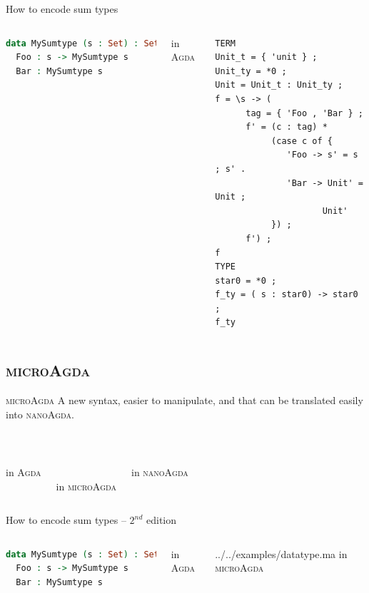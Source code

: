 \documentclass[xcolor=svgnames,11pt]{beamer}
\newcommand{\agda}{\textsc{Agda}\xspace}
\newcommand{\ma}{\textsc{microAgda}\xspace}
\newcommand{\na}{\textsc{nanoAgda}\xspace}
\begin{document}
\begin{frame}[fragile]{How to encode sum types}
\begin{columns}
\begin{lstlisting}[language=Agda]
data MySumtype (s : Set) : Set where
  Foo : s -> MySumtype s
  Bar : MySumtype s
\end{lstlisting}
\centering in \agda
{}\pause
\begin{lstlisting}[basicstyle=\scriptsize\ttfamily,language=nanoAgda]
TERM
Unit_t = { 'unit } ;
Unit_ty = *0 ;
Unit = Unit_t : Unit_ty ;
f = \s -> (
      tag = { 'Foo , 'Bar } ;
      f' = (c : tag) *
           (case c of {
              'Foo -> s' = s ; s' .
              'Bar -> Unit' = Unit ;
                     Unit'
           }) ;
      f') ;
f
TYPE
star0 = *0 ;
f_ty = ( s : star0) -> star0 ;
f_ty
\end{lstlisting}
\end{columns}
\end{frame}

\subsection{\ma}
\begin{frame}[fragile]{\ma}
A new syntax, easier to manipulate, and that can be translated easily into \na.\pause

\ \\
\begin{columns}

\centering in \agda

\ \\

\centering in \ma
{}

\centering in \na
\end{columns}

\end{frame}


\begin{frame}[fragile]{How to encode sum types -- $2^{nd}$ edition}
\begin{columns}
\begin{lstlisting}[language=Agda]
data MySumtype (s : Set) : Set where
  Foo : s -> MySumtype s
  Bar : MySumtype s
\end{lstlisting}
\centering in \agda
{}

{../../examples/datatype.ma}
\centering in \ma
\end{columns}
\end{frame}
\end{document}

